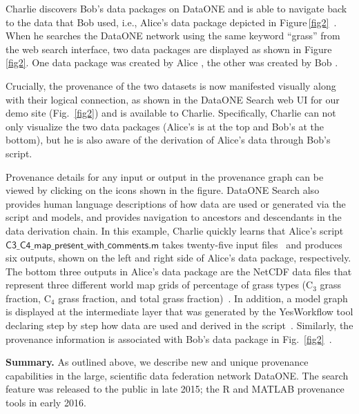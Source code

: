 \documentclass[a4paper]{llncs}
\newcommand{\mypara}[1]{\vspace{4pt}\noindent\textbf{#1}}
\newcommand{\code}[1]{\ensuremath{\mathsf{#1}}}
\newcommand{\Figref}[1]{Figure\,\ref{#1}}
\begin{document}
Charlie discovers Bob's data packages on DataONE and is able to navigate back to the data that Bob used, i.e., Alice's data package depicted in \Figref{fig2}~\cite{Katz,data-trajectories}. When he searches the DataONE network using the same keyword ``grass'' from the web search interface, two data packages are displayed as shown in \Figref{fig2}. One data package was created by Alice \cite{yaxing}, the other was created by Bob \cite{christopher}.

Crucially, the provenance of the two datasets is now manifested visually along with their logical connection, as shown in the DataONE Search web UI for our demo site \cite{dataone-demo} (Fig.~\ref{fig2}) and is available to Charlie. Specifically, Charlie can not only visualize the two data packages (Alice's is at the top and Bob's at the bottom), but he is also aware of the derivation of Alice's data through Bob's script.

Provenance details for any input or output in the provenance graph can be viewed by clicking on the icons shown in the figure. %
DataONE Search also provides human language descriptions of how data are used or generated via the script and models, and provides navigation to ancestors and descendants in the data derivation chain.
%
In this example, Charlie quickly learns that Alice's script \code{C3\_C4\_map\_present\_with\_comments.m} takes twenty-five input files~\cite{MsTMIP-model-driver-data-set} and produces six outputs, shown on the left and right side of Alice's data package, respectively. The bottom three outputs in Alice's data package are the NetCDF data files that represent three different world map grids of percentage of grass types (C$_3$ grass fraction, C$_4$ grass fraction, and total grass fraction)~\cite{MsTMIP-model-driver-data-set}. In addition, a model graph is displayed at the intermediate layer that was generated by the YesWorkflow tool declaring step by step how data are used and derived in the script~\cite{yesworkflow}. Similarly, the provenance information is associated with Bob's data package in Fig.~\ref{fig2}~\cite{christopher,dataone-prov-tech-report-2016,MsTMIP-model-output-data-set}.



\mypara{Summary.}  As outlined above, we describe new and unique provenance capabilities in the large, scientific data federation network DataONE. The search feature was released to the public in late 2015; the R and MATLAB provenance tools in early 2016.



\end{document}
